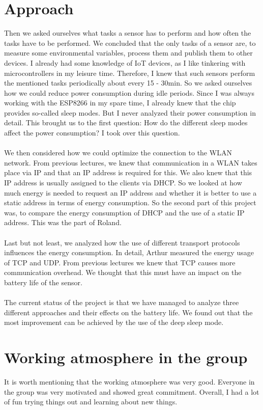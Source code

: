 \section*{Approach}
Then we asked ourselves what tasks a sensor has to perform and how often the tasks have to be performed. We concluded that the only tasks of a sensor are, to measure some environmental variables, process them and publish them to other devices. I already had some knowledge of IoT devices, as I like tinkering with microcontrollers in my leisure time. Therefore, I knew that such sensors perform the mentioned tasks periodically about every 15 - 30min.
So we asked ourselves how we could reduce power consumption during idle periods. 
Since I was always working with the ESP8266 in my spare time, I already knew that the chip provides so-called sleep modes. But I never analyzed their power consumption in detail.
This brought us to the first question: How do the different sleep modes affect the power consumption?
I took over this question.\\
\\
We then considered how we could optimize the connection to the WLAN network. From previous lectures, we knew that communication in a WLAN takes place via IP and that an IP address is required for this. We also knew that this IP address is usually assigned to the clients via DHCP.
So we looked at how much energy is needed to request an IP address and whether it is better to use a static address in terms of energy consumption.
So the second part of this project was, to compare the energy consumption of DHCP and the use of a static IP address.
This was the part of Roland.\\
\\
Last but not least, we analyzed how the use of different transport protocols influences the energy consumption. In detail, Arthur measured the energy usage of TCP and UDP. From previous lectures we knew that TCP causes more communication overhead. We thought that this must have an impact on the battery life of the sensor. \\
\\
The current status of the project is that we have managed to analyze three different approaches and their effects on the battery life. We found out that the most improvement can be achieved by the use of the deep sleep mode.


\section*{Working atmosphere in the group}
It is worth mentioning that the working atmosphere was very good. Everyone in the group was very motivated and showed great commitment. Overall, I had a lot of fun trying things out and learning about new things. 

